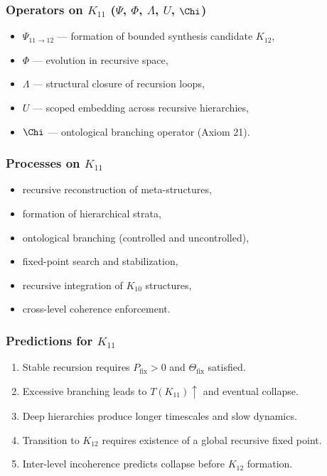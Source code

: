 \subsubsection{Operators on $K_{11}$ ($\Psi$, $\Phi$, $\Lambda$, $U$, $\Chi$)}

\begin{itemize}
    \item $\Psi_{11\to12}$ — formation of bounded synthesis candidate $K_{12}$,
    \item $\Phi$ — evolution in recursive space,
    \item $\Lambda$ — structural closure of recursion loops,
    \item $U$ — scoped embedding across recursive hierarchies,
    \item $\Chi$ — ontological branching operator (Axiom 21).
\end{itemize}

\subsubsection{Processes on $K_{11}$}

\begin{itemize}
    \item recursive reconstruction of meta-structures,
    \item formation of hierarchical strata,
    \item ontological branching (controlled and uncontrolled),
    \item fixed-point search and stabilization,
    \item recursive integration of $K_{10}$ structures,
    \item cross-level coherence enforcement.
\end{itemize}

\subsubsection{Predictions for $K_{11}$}

\begin{enumerate}
    \item Stable recursion requires $P_{\mathrm{fix}}>0$ and $\Theta_{\mathrm{fix}}$ satisfied.
    \item Excessive branching leads to $T(K_{11})\uparrow$ and eventual collapse.
    \item Deep hierarchies produce longer timescales and slow dynamics.
    \item Transition to $K_{12}$ requires existence of a global recursive fixed point.
    \item Inter-level incoherence predicts collapse before $K_{12}$ formation.
\end{enumerate}

